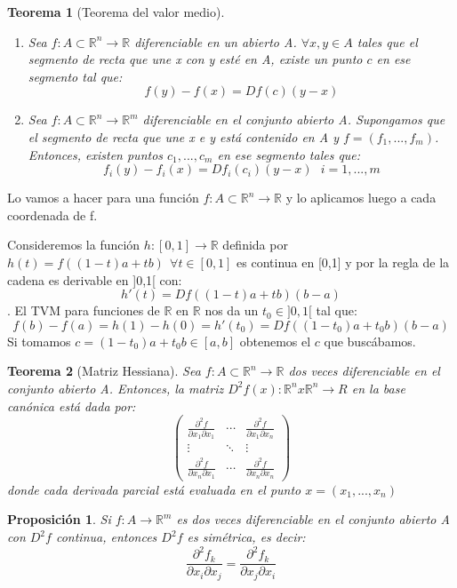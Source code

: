 \documentclass[11pt, a4paper]{article}
\makeatletter
\renewenvironment{proof}[1][\proofname] {\vspace{-15pt}\par\pushQED{\qed}\normalfont\topsep6\p@\@plus6\p@\relax\trivlist\item[\hskip\labelsep\it#1\@addpunct{.}]\ignorespaces}{\popQED\endtrivlist\@endpefalse}
\newcommand{\R}{\mathbb{R}}
\theoremstyle{theorem-style}
\newtheorem*{nth}{Teorema}
\newtheorem*{nprop}{Proposición}
\theoremstyle{definition-style}
\theoremstyle{remark-style}
\theoremstyle{example-style}
\newenvironment{nlist}
{\begin{enumerate}
\renewcommand\labelenumi{(\emph{\roman{enumi})}}}
{\end{enumerate}}
\makeatother
\begin{document}
\begin{nth}[Teorema del valor medio]\hfill\\
	\begin{nlist}
	\item Sea $f:A \subset \R^n\to \R$ diferenciable en un abierto A. $\forall x,y \in A$ tales que el segmento de recta que une x con y esté en A, existe un punto $c$ en ese segmento tal que:
	\[
	f(y)-f(x) = Df(c)(y-x)
	\]
	\item Sea $f:A \subset \R^n \to \R^m$ diferenciable en el conjunto abierto A. Supongamos que el segmento de recta que une x e y está contenido en A y $f=(f_1,...,f_m)$. Entonces, existen puntos $c_1,...,c_m$ en ese segmento tales que:
	\[
	f_i(y) - f_i(x) = Df_i(c_i)(y-x) \ \ \ i = 1,...,m
	\]
\end{nlist}
\end{nth}
\begin{proof}
	Lo vamos a hacer para una función $f:A \subset \R^n \to \R$ y lo aplicamos luego a cada coordenada de f.
	
	Consideremos la función $h:[0,1] \to \R$ definida por $h(t) = f((1-t)a +tb) \ \ \forall t \in [0,1]$ es continua en [0,1] y por la regla de la cadena es derivable en ]0,1[ con:
	\[
	h'(t) = Df((1-t)a +tb)(b-a)
	\].
	El TVM para funciones de $\R$ en $\R$ nos da un $t_0 \in ]0,1[$ tal que:
	\[
	f(b)-f(a) = h(1)-h(0) = h'(t_0) = Df((1-t_0)a+t_0b)(b-a)
	\]
	Si tomamos $c=(1-t_0)a+t_0b \in [a,b]$ obtenemos el $c$ que buscábamos.
	
\end{proof}

\begin{nth}[Matriz Hessiana]
	Sea $f:A\subset \R^n \to \R$ dos veces diferenciable en el conjunto abierto A. Entonces, la matriz $D^2f(x): \R^nx\R^n \to R$ en la base canónica está dada por:
	\[
	\begin{pmatrix}
 \frac{\partial^2 f}{\partial x_1 \partial x_1} & \cdots & \frac{\partial^2 f}{\partial x_1\partial x_n} \\
 \vdots & \ddots&\vdots \\
 \frac{\partial^2 f}{\partial x_n \partial x_1} & \cdots & \frac{\partial^2 f}{\partial x_n \partial x_n}
\end{pmatrix} 
	\]
	donde cada derivada parcial está evaluada en el punto $x=(x_1,...,x_n)$
\end{nth}

\begin{nprop}
	Si $f:A \to \R^m$ es dos veces diferenciable en el conjunto abierto A con $D^2 f$ continua, entonces $D^2f$ es simétrica, es decir:
	\[
	\frac{\partial^2 f_k}{\partial x_i \partial x_j} =  \frac{\partial^2 f_k}{\partial x_j \partial x_i}
	\]
\end{nprop}
\end{document}
